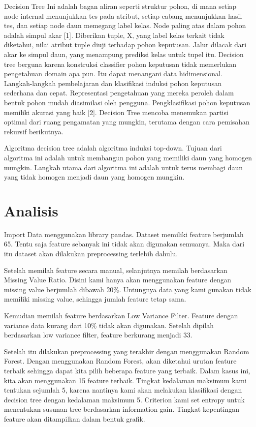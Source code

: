\documentclass[conference]{IEEEtran}
\begin{document}
Decision Tree Ini adalah bagan aliran seperti struktur pohon, di mana setiap node internal menunjukkan tes pada atribut, setiap cabang menunjukkan hasil tes, dan setiap node daun memegang label kelas.  Node paling atas dalam pohon adalah simpul akar [1].  Diberikan tuple, X, yang label kelas terkait tidak diketahui, nilai atribut tuple diuji terhadap pohon keputusan.  Jalur dilacak dari akar ke simpul daun, yang menampung prediksi kelas untuk tupel itu. Decision tree berguna karena konstruksi classifier pohon keputusan tidak memerlukan pengetahuan domain apa pun.  Itu dapat menangani data hidimensional.  Langkah-langkah pembelajaran dan klasifikasi induksi pohon keputusan sederhana dan cepat.  Representasi pengetahuan yang mereka peroleh dalam bentuk pohon mudah diasimilasi oleh pengguna.  Pengklasifikasi pohon keputusan memiliki akurasi yang baik [2]. Decision Tree mencoba menemukan partisi optimal dari ruang pengamatan yang mungkin, terutama dengan cara pemisahan rekursif berikutnya.

Algoritma decision tree adalah algoritma induksi top-down.  Tujuan dari algoritma ini adalah untuk membangun pohon yang memiliki daun yang homogen mungkin.  Langkah utama dari algoritma ini adalah untuk terus membagi daun yang tidak homogen menjadi daun yang homogen mungkin.

\section{Analisis}
Import Data menggunakan library pandas. Dataset memiliki feature berjumlah 65. Tentu saja feature sebanyak ini tidak akan digunakan semuanya. Maka dari itu dataset akan dilakukan preprocessing terlebih dahulu.

Setelah memilah feature secara manual, selanjutnya memilah berdasarkan Missing Value Ratio. Disini kami hanya akan menggunakan feature dengan missing value berjumlah dibawah 20\%. Untungnya data yang kami gunakan tidak memiliki missing value, sehingga jumlah feature tetap sama.

Kemudian memilah feature berdasarkan Low Variance Filter. Feature dengan variance data kurang dari 10\% tidak akan digunakan. Setelah dipilah berdasarkan low variance filter, feature berkurang menjadi 33.

Setelah itu dilakukan preprocessing yang terakhir dengan menggunakan Random Forest. Dengan menggunakan Random Forest, akan diketahui urutan feature terbaik sehingga dapat kita pilih beberapa feature yang terbaik. Dalam kasus ini, kita akan menggunakan 15 feature terbaik. Tingkat kedalaman maksimum kami tentukan sejumlah 5, karena nantinya kami akan melakukan klasifikasi dengan decision tree dengan kedalaman maksimum 5. Criterion kami set entropy untuk menentukan susunan tree berdasarkan information gain. Tingkat kepentingan feature akan ditampilkan dalam bentuk grafik.
\end{document}
